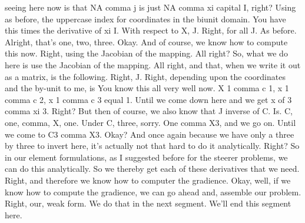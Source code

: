 \documentclass[10pt]{article}
\begin{document}
seeing here now is that NA comma j is just NA comma xi capital I, right? Using as before, the uppercase index for coordinates in the biunit domain. You have this times the derivative of xi I. With respect to X, J. Right, for all J. As before. Alright, that's one, two, three. Okay. And of course, we know how to compute this now. Right, using the Jacobian of the mapping. All right? So, what we do here is use the Jacobian of the mapping. All right, and that, when we write it out as a matrix, is the following. Right, J. Right, depending upon the coordinates and the by-unit to me, is You know this all very well now. X 1 comma c 1, x 1 comma c 2, x 1 comma c 3 equal 1. Until we come down here and we get x of 3 comma xi 3. Right? But then of course, we also know that J inverse of C. Is. C, one, comma, X, one. Under C, three, sorry. One comma X3, and we go on. Until we come to C3 comma X3. Okay? And once again because we have only a three by three to invert here, it's actually not that hard to do it analytically. Right? So in our element formulations, as I suggested before for the steerer problems, we can do this analytically. So we thereby get each of these derivatives that we need. Right, and therefore we know how to computer the gradience. Okay, well, if we know how to compute the gradience, we can go ahead and, assemble our problem. Right, our, weak form. We do that in the next segment. We'll end this segment here.
\end{document}

